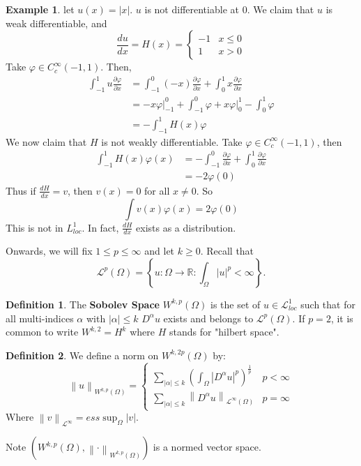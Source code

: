 \documentclass[12pt, a4paper]{article}
\theoremstyle{definition}
\newtheorem{defn}{Definition}
\newtheorem{example}{Example}
\newcommand{\R}{\mathbb{R}}                           %
\newcommand{\eL}{\mathcal{L}}                         %
\newcommand{\norm}[1]{\left\lVert#1\right\rVert}
\begin{document}
\begin{tcolorbox}[breakable, colback = white]
\begin{example}
	let $u(x) = |x|$. $u$ is not differentiable at $0$. We claim that $u$ is weak differentiable, and 
	$$ \frac{ du }{ dx } = H(x) = 
	\begin{cases}
		-1 & x \leq 0 \\ 1 & x>0
	\end{cases} $$ 
	Take $\varphi \in C_c^\infty (-1,1)$. Then, 
	\begin{align*}
		\int_{-1}^1 u \frac{ \partial \varphi }{ \partial x } & = \int_{-1}^0 (-x) \frac{ \partial \varphi }{ \partial x } + \int_0^1 x \frac{ \partial \varphi }{ \partial x } 
		\\ & = -x \varphi \Big|_{-1}^0 + \int_{-1}^0 \varphi  + x \varphi\Big|_{0}^1 - \int_0^1 \varphi 
		\\ & = - \int_{-1}^1 H(x) \varphi 
	\end{align*}
	We now claim that $H$ is not weakly differentiable. 
	Take $\varphi \in C_c^\infty(-1,1)$, then 
\begin{align*}
	\int_{-1}^1 H(x) \varphi(x) & = -\int_{-1}^0 \frac{ \partial \varphi  }{ \partial x } + \int_0^1 \frac{ \partial \varphi  }{ \partial x } 
	\\ & = -2 \varphi(0)
\end{align*}
	Thus if $ \frac{ dH }{ dx } = v$, then $v(x) = 0$ for all $x \neq 0$. So 
	$$ \int v(x) \varphi(x) = 2 \varphi(0) $$ 
	This is not in $L_{loc}^1$. In fact, $ \frac{ dH }{ dx }$ exists as a distribution. 
\end{example}
\end{tcolorbox}
Onwards, we will fix $1 \leq p \leq\infty$ and let $k \geq 0$. Recall that 
$$ \eL^p(\Omega) = \left\{ u : \Omega \to \R : \int_{\Omega} |u|^p < \infty \right\} .$$
\begin{tcolorbox}[colback = white]
\begin{defn}
	The \textbf{Sobolev Space} $W^{k,p}(\Omega)$ is the set of $u\in \eL^1_{loc}$ such that for all multi-indices $\alpha$ with  $|\alpha|\leq k$ $D^\alpha u$ exists and belongs to $\eL^p(\Omega)$. If $p = 2$, it is common to write $W^{k,2} = H^k$ where $H$ stands for "hilbert space".
\end{defn}
\end{tcolorbox}
\begin{tcolorbox}[colback = white]
\begin{defn}
	We define a norm on $W^{k,2p}(\Omega)$ by:
	$$ \norm{u}_{W^{k,p}(\Omega)} =  \begin{cases}
	\sum_{|\alpha| \leq k} \left(  \int_{\Omega} \left| D^\alpha u \right|^p \right)^{	\frac{ 1 }{ p }	 } &  p < \infty
		\\ \sum_{ |\alpha| \leq k} \norm{D^\alpha u}_{\eL^\infty(\Omega)} & p = \infty 
	\end{cases}$$ 
	Where $ \norm{v}_{\eL^\infty} = ess \sup_\Omega |v|$. 
\end{defn}
	Note $ \left( W^{k,p} (\Omega), \norm{\cdot}_{W^{k,p}(\Omega)} \right)$ is a normed vector space. 
\end{tcolorbox}
\end{document}

